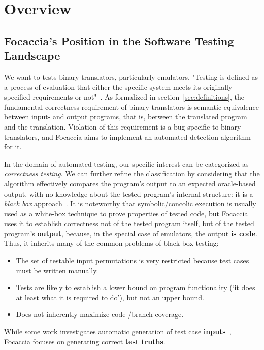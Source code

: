 \chapter{Overview}

\section{Focaccia's Position in the Software Testing Landscape}

We want to tests binary translators, particularly emulators. "Testing is defined as a process of evaluation that either
the specific system meets its originally specified requirements or not"~\cite{jamil2016software_testing}. As formalized
in section~\ref{sec:definitions}, the fundamental correctness requirement of binary translators is semantic equivalence
between input- and output programs, that is, between the translated program and the translation. Violation of this
requirement is a bug specific to binary translators, and Focaccia aims to implement an automated detection algorithm for
it.

In the domain of automated testing, our specific interest can be categorized as \textit{correctness testing}. We can
further refine the classification by considering that the algorithm effectively compares the program's output to an
expected oracle-based output, with no knowledge about the tested program's internal structure: it is a \textit{black
box} approach~\cite{sawant2012software}. It is noteworthy that symbolic/concolic execution is usually used as a
white-box technique to prove properties of tested code, but Focaccia uses it to establish correctness not of the tested
program itself, but of the tested program's \textbf{output}, because, in the special case of emulators, the output
\textbf{is code}. Thus, it inherits many of the common problems of black box testing:

\begin{itemize}
    \item The set of testable input permutations is very restricted because test cases must be written manually.
    \item Tests are likely to establish a lower bound on program functionality (`it does at least what it is required to
        do'), but not an upper bound.
    \item Does not inherently maximize code-/branch coverage.
\end{itemize}

While some work investigates automatic generation of test case \textbf{inputs}~\cite{Agha+2005Cute}, Focaccia focuses on
generating correct \textbf{test truths}.


